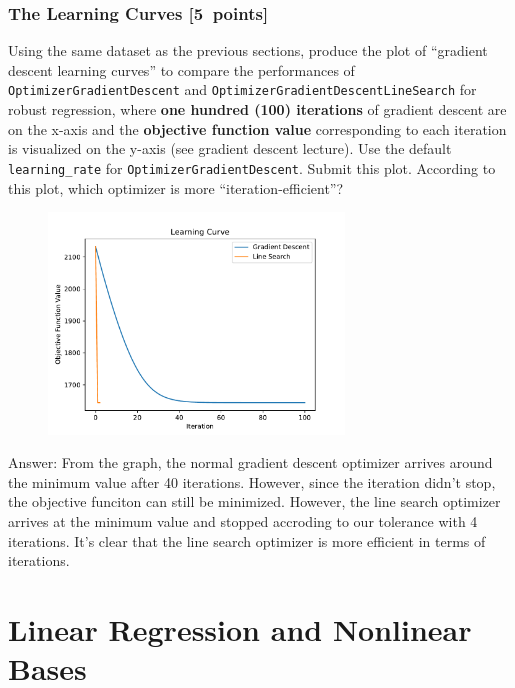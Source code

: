 \documentclass{article}
\newcommand{\blu}[1]{{\textcolor{blu}{#1}}}
\newenvironment{answer}{\par\begingroup\color{gre}Answer: }{\endgroup}
\let\ask\blu
\newcommand\pts[1]{\textcolor{pointscolour}{[#1~points]}}
\begin{document}
\subsubsection{The Learning Curves \pts{5}}

Using the same dataset as the previous sections, produce the plot of ``gradient descent learning curves'' to compare the performances of \texttt{OptimizerGradientDescent} and \texttt{OptimizerGradientDescentLineSearch} for robust regression, where \textbf{one hundred (100) iterations} of gradient descent are on the x-axis and the \textbf{objective function value} corresponding to each iteration is visualized on the y-axis (see gradient descent lecture). Use the default \texttt{learning\_rate} for \texttt{OptimizerGradientDescent}. \ask{Submit this plot. According to this plot, which optimizer is more ``iteration-efficient''?}

\begin{figure}
	\centering
	\includegraphics[width = 0.7\textwidth]{figs/LearningCurve.pdf}
\end{figure}

\begin{answer}
	From the graph, the normal gradient descent optimizer arrives around the minimum value after 40 iterations. However, since the iteration didn't stop, the objective funciton can still be minimized. However, the line search optimizer arrives at the minimum value and stopped accroding to our tolerance with 4 iterations. It's clear that the line search optimizer is more efficient in terms of iterations.
\end{answer}
\clearpage
\section{Linear Regression and Nonlinear Bases}
\end{document}
